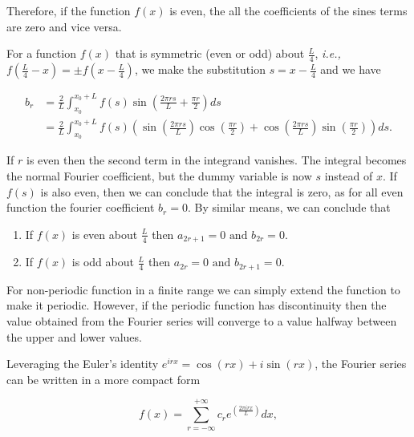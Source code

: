 \documentclass[english,a4paper,12pt]{report}
\begin{document}
Therefore, if the function \(f(x)\) is even, the all the coefficients of the sines terms are zero and vice versa. 

For a function \(f(x)\) that is symmetric (even or odd) about \(\displaystyle \frac{L}{4} \), \textit{i.e.,} \(\displaystyle f(\frac{L}{4}-x ) = \pm f(x - \frac{L}{4} )\), we make the substitution \(\displaystyle s = x-\frac{L}{4} \) and we have 

\begin{equation}
    \begin{aligned} 
    b_{r} &= \frac{2}{L} \int_{x_0 }^{x_0 + L} f(s) \sin \left( \frac{2 \pi rs}{L} + \frac{\pi r}{2} \right) ds \\ &= \frac{2}{L} \int_{x_0 }^{x_0 + L} f(s) \left( \sin \left( \frac{2 \pi  rs}{L}  \right) \cos \left( \frac{\pi r}{2}  \right) + \cos \left( \frac{2 \pi rs}{L}  \right) \sin \left( \frac{\pi r}{2} \right)\right) ds.        
    \end{aligned} 
\end{equation}

If \(r\) is even then the second term in the integrand vanishes. The integral becomes the normal Fourier coefficient, but the dummy variable is now \(s\) instead of \(x\). If \(f(s)\) is also even, then we can conclude that the integral is zero, as for all even function the fourier coefficient \(b_{r} = 0\). By similar means, we can conclude that 

\begin{enumerate}
    \item If \(f(x)\) is even about \(\frac{L}{4} \) then \(a_{2r+1} = 0 \text { and } b_{2r} = 0 \).
    \item If \(f(x)\) is odd about \(\frac{L}{4} \) then \(a_{2r} = 0 \text { and } b_{2r+1} = 0 \).      
\end{enumerate}

For non-periodic function in a finite range we can simply extend the function to make it periodic. However, if the periodic function has discontinuity then the value obtained from the Fourier series will converge to a value halfway between the upper and lower values.

Leveraging the Euler's identity \(e^{irx} = \cos (rx) + i\sin (rx) \), the Fourier series can be written in a more compact form

\begin{equation}
    f(x) = \sum_{r=-\infty}^{+\infty} c_{r} e^{\left( \frac{2\pi i rx}{L}  \right)}dx,  
\end{equation}
\end{document}
